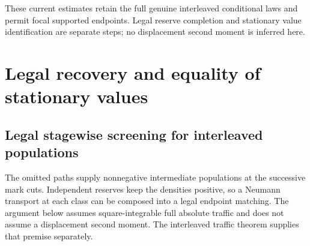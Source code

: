 \documentclass[11pt,reqno]{amsart}
\theoremstyle{definition}
\theoremstyle{remark}
\numberwithin{equation}{section}
\begin{document}
These current estimates retain the full genuine interleaved conditional
laws and permit focal supported endpoints. Legal reserve completion and
stationary value identification are separate steps; no displacement
second moment is inferred here.

\section{Legal recovery and equality of stationary values}\label{sec:legal-recovery}

\subsection{Legal stagewise screening for interleaved populations}
\label{subsec:interleaved-path-screening}

The omitted paths supply nonnegative intermediate populations at the
successive mark cuts. Independent reserves keep the densities positive,
so a Neumann transport at each class can be composed into a legal
endpoint matching. The argument below assumes square-integrable full
absolute traffic and does not assume a displacement second moment.
The interleaved traffic theorem supplies that premise separately.
\end{document}
